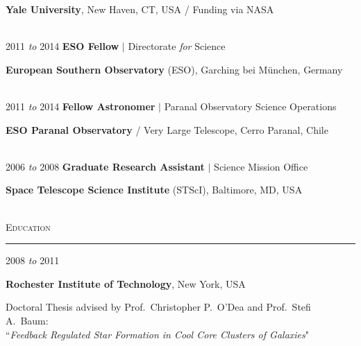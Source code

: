 \documentclass[11pt]{article}
\makeatletter
\def\vhrulefill#1{\leavevmode\leaders\hrule\@height#1\hfill \kern\z@}
\makeatother
\begin{document}
\hspace{42mm} \parbox{5.15in}{\textbf{Yale University}, New Haven, CT, USA / Funding via NASA}\\



\hspace{2.5mm} 2011 \textit{to} 2014 \hspace{17mm} \textbf{ESO Fellow} $|$ Directorate \textit{for} Science

\hspace{42mm} \parbox{5.15in}{\textbf{European Southern Observatory} (ESO), Garching bei M\"{u}nchen, Germany}\\




\hspace{2.5mm} 2011 \textit{to} 2014 \hspace{17mm} \textbf{Fellow Astronomer} $|$ Paranal Observatory Science Operations

\hspace{42mm} \parbox{5.15in}{\textbf{ESO Paranal Observatory} / Very Large Telescope, Cerro Paranal, Chile} \\



\hspace{2.5mm} 2006 \textit{to} 2008 \hspace{17mm} \textbf{Graduate Research Assistant} $|$ Science Mission Office

\hspace{42mm} \parbox{5.15in}{\textbf{Space Telescope Science Institute} (STScI), Baltimore, MD, USA} \\



\textsc{Education} \vhrulefill{0.4pt}

\vspace{2mm}


\hspace{2.5mm}2008 \textit{to} 2011 

\hspace{42mm}\parbox{5.15in}{\textbf{Rochester Institute of Technology}, New York, USA \\}

\hspace{42mm} \parbox{5.15in}{Doctoral Thesis advised by Prof.~Christopher P.~O'Dea and Prof.~Stefi A.~Baum: \\ ``\textit{Feedback Regulated Star Formation in Cool Core Clusters of Galaxies}"} \\
\end{document}

